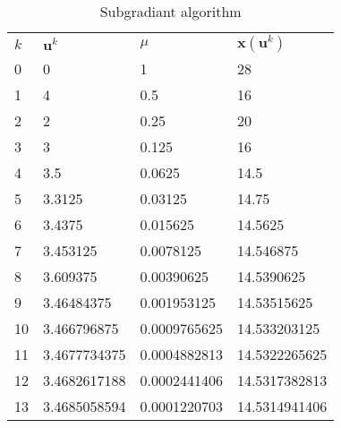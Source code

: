 \begin{table}[h]
\centering
\caption{Subgradiant algorithm}
\label{tabl_sub_algo}
\begin{tabular}{llll}
$k$ & $\mathbf{u}^k$   & $\mu$   & $\mathbf{x}(\mathbf{u}^k)$ \\
0 & 0 & 1 & 28 \\
1 & 4 & 0.5	& 16 \\
2 & 2 & 0.25 & 20 \\
3 & 3 & 0.125 & 16 \\
4 & 3.5 & 0.0625 & 14.5 \\
5 & 3.3125 & 0.03125 & 14.75 \\
6 & 3.4375 & 0.015625 & 14.5625 \\
7 & 3.453125 & 0.0078125 & 14.546875 \\
8 & 3.609375 & 0.00390625 & 14.5390625 \\
9 & 3.46484375 & 0.001953125 & 14.53515625 \\
10 & 3.466796875 & 0.0009765625 & 14.533203125 \\
11 & 3.4677734375 & 0.0004882813 & 14.5322265625 \\
12 & 3.4682617188 & 0.0002441406 & 14.5317382813 \\
13 & 3.4685058594 & 0.0001220703 & 14.5314941406
  
\end{tabular}
\end{table}